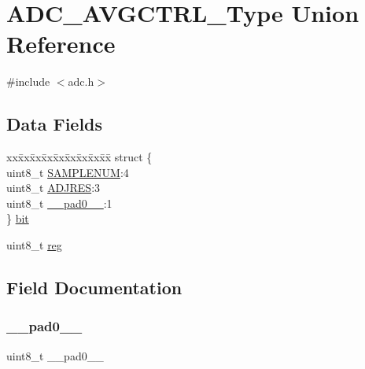 \hypertarget{union_a_d_c___a_v_g_c_t_r_l___type}{}\section{A\+D\+C\+\_\+\+A\+V\+G\+C\+T\+R\+L\+\_\+\+Type Union Reference}
\label{union_a_d_c___a_v_g_c_t_r_l___type}


{\ttfamily \#include $<$adc.\+h$>$}

\subsection*{Data Fields}
\begin{DoxyCompactItemize}
\item 
\begin{tabbing}
xx\=xx\=xx\=xx\=xx\=xx\=xx\=xx\=xx\=\kill
struct \{\\
\>uint8\_t \mbox{\hyperlink{union_a_d_c___a_v_g_c_t_r_l___type_ab231938bef1111d01bae74587f14c984}{SAMPLENUM}}:4\\
\>uint8\_t \mbox{\hyperlink{union_a_d_c___a_v_g_c_t_r_l___type_a117f1cb5db86253a9d5a76a8dfd3e898}{ADJRES}}:3\\
\>uint8\_t \mbox{\hyperlink{union_a_d_c___a_v_g_c_t_r_l___type_a8b4eebe79ded0459acec2f4950102ba3}{\_\_pad0\_\_}}:1\\
\} \mbox{\hyperlink{union_a_d_c___a_v_g_c_t_r_l___type_ad81a2b15d9deda80877f820f3c078333}{bit}}\\

\end{tabbing}\item 
uint8\+\_\+t \mbox{\hyperlink{union_a_d_c___a_v_g_c_t_r_l___type_a9428adc9af4653a2050e2536b55dec8d}{reg}}
\end{DoxyCompactItemize}


\subsection{Field Documentation}
\mbox{\label{union_a_d_c___a_v_g_c_t_r_l___type_a8b4eebe79ded0459acec2f4950102ba3}} 
\subsubsection{\texorpdfstring{\_\_pad0\_\_}{\_\_pad0\_\_}}
{\footnotesize\ttfamily uint8\+\_\+t \+\_\+\+\_\+pad0\+\_\+\+\_\+}

